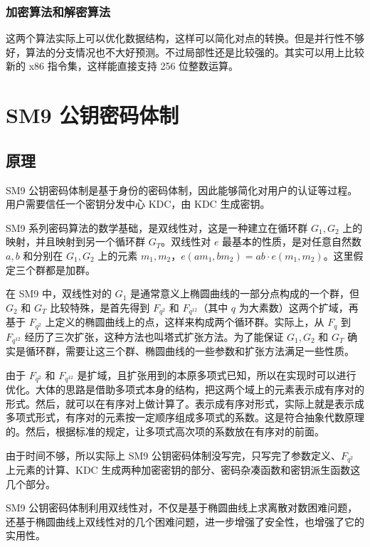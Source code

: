 \documentclass[12pt,a4paper]{article}
\begin{document}
\subsubsection*{加密算法和解密算法}

这两个算法实际上可以优化数据结构，这样可以简化对点的转换。但是并行性不够好，算法的分支情况也不大好预测。不过局部性还是比较强的。其实可以用上比较新的 x86 指令集，这样能直接支持 256 位整数运算。

\section*{SM9 公钥密码体制}

\subsection*{原理}

SM9 公钥密码体制是基于身份的密码体制，因此能够简化对用户的认证等过程。用户需要信任一个密钥分发中心 KDC，由 KDC 生成密钥。

SM9 系列密码算法的数学基础，是双线性对，这是一种建立在循环群 $ G_1, G_2 $ 上的映射，并且映射到另一个循环群 $ G_T $。双线性对 $ e $ 最基本的性质，是对任意自然数 $ a, b $ 和分别在 $ G_1, G_2 $ 上的元素 $ m_1, m_2 $，$ e(a m_1, b m_2) = a b \cdot e(m_1, m_2) $。这里假定三个群都是加群。

在 SM9 中，双线性对的 $ G_1 $ 是通常意义上椭圆曲线的一部分点构成的一个群，但 $ G_2 $ 和 $ G_T $ 比较特殊，是首先得到 $ F_{q^2} $ 和 $ F_{q^{12}} $（其中 $ q $ 为大素数）这两个扩域，再基于 $ F_{q^2} $ 上定义的椭圆曲线上的点，这样来构成两个循环群。实际上，从 $ F_q $ 到 $ F_{q^{12}} $ 经历了三次扩张，这种方法也叫塔式扩张方法。为了能保证 $ G_1, G_2 $ 和 $ G_T $ 确实是循环群，需要让这三个群、椭圆曲线的一些参数和扩张方法满足一些性质。

由于 $ F_{q^2} $ 和 $ F_{q^{12}} $ 是扩域，且扩张用到的本原多项式已知，所以在实现时可以进行优化。大体的思路是借助多项式本身的结构，把这两个域上的元素表示成有序对的形式。然后，就可以在有序对上做计算了。表示成有序对形式，实际上就是表示成多项式形式，有序对的元素按一定顺序组成多项式的系数。这是符合抽象代数原理的。然后，根据标准的规定，让多项式高次项的系数放在有序对的前面。

由于时间不够，所以实际上 SM9 公钥密码体制没写完，只写完了参数定义、$ F_{q^2} $ 上元素的计算、KDC 生成两种加密密钥的部分、密码杂凑函数和密钥派生函数这几个部分。

SM9 公钥密码体制利用双线性对，不仅是基于椭圆曲线上求离散对数困难问题，还基于椭圆曲线上双线性对的几个困难问题，进一步增强了安全性，也增强了它的实用性。
\end{document}

